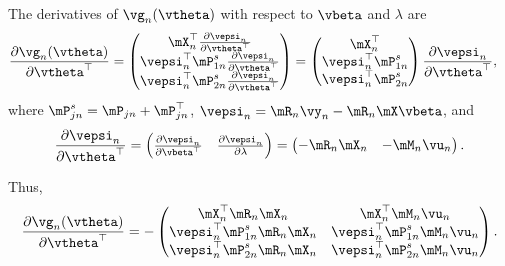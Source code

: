 \documentclass[english,12pt]{book}\usepackage[]{graphicx}\usepackage[]{xcolor}
\begin{document}
The derivatives of $\vg_n(\vtheta)$ with respect to $\vbeta$ and $\lambda$ are
\begin{equation*}
  \begin{aligned}
    \frac{\partial \vg_n(\vtheta)}{\partial \vtheta ^\top} & = \begin{pmatrix}
    \mX_n^\top\frac{\partial \vepsi_n}{\partial \vtheta^\top} \\
    \vepsi_n^\top\mP_{1n}^s\frac{\partial \vepsi_n}{\partial \vtheta^\top} \\
     \vepsi_n^\top\mP_{2n}^s\frac{\partial \vepsi_n}{\partial \vtheta^\top}
\end{pmatrix} = \begin{pmatrix}
    \mX_n^\top \\
    \vepsi_n^\top \mP_{1n}^s \\
     \vepsi_n^\top \mP_{2n}^s
\end{pmatrix}\frac{\partial \vepsi_n}{\partial \vtheta^\top}, 
  \end{aligned}
\end{equation*}
%
where $\mP_{jn}^s = \mP_{jn} + \mP_{jn}^\top$, $\vepsi_n = \mR_n\vy_n - \mR_n\mX\vbeta$, and 
\begin{equation*}
  \frac{\partial \vepsi_n}{\partial \vtheta^\top}  = \begin{pmatrix}
    \frac{\partial \vepsi_n}{\partial \vbeta^\top} & \frac{\partial \vepsi_n}{\partial \lambda} 
    \end{pmatrix}
= \begin{pmatrix}
      -\mR_n\mX_n & - \mM_n\vu_n
  \end{pmatrix}.
\end{equation*}

Thus, 
\begin{equation*}
\frac{\partial \vg_n(\vtheta)}{\partial \vtheta ^\top} = 
- \begin{pmatrix}
 \mX_n^\top\mR_n\mX_n & \mX_n^\top\mM_n\vu_n \\
 \vepsi_n^\top\mP_{1n}^s\mR_n\mX_n & \vepsi_n^\top\mP_{1n}^s\mM_n\vu_n \\
 \vepsi_n^\top\mP_{2n}^s\mR_n\mX_n & \vepsi_n^\top\mP_{2n}^s\mM_n\vu_n 
\end{pmatrix}.
\end{equation*}
\end{document}
